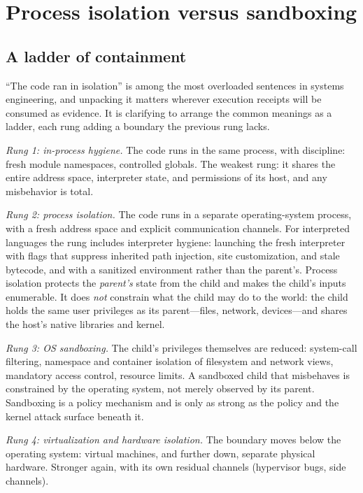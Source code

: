 \section{Process isolation versus sandboxing}\label{ch02:isolation}

\subsection{A ladder of containment}\label{ch02:ladder}

``The code ran in isolation'' is among the most overloaded sentences
in systems engineering, and unpacking it matters wherever execution
receipts will be consumed as evidence. It is clarifying to arrange
the common meanings as a ladder, each rung adding a boundary the
previous rung lacks.

\emph{Rung 1: in-process hygiene.} The code runs in the same
process, with discipline: fresh module namespaces, controlled
globals. The weakest rung: it shares the entire address space,
interpreter state, and permissions of its host, and any misbehavior
is total.

\emph{Rung 2: process isolation.} The code runs in a separate
operating-system process, with a fresh address space and explicit
communication channels. For interpreted languages the rung includes
interpreter hygiene: launching the fresh interpreter with flags
that suppress inherited path injection, site customization, and
stale bytecode, and with a sanitized environment rather than the
parent's. Process isolation protects the \emph{parent's} state from
the child and makes the child's inputs enumerable. It does
\emph{not} constrain what the child may do to the world: the child
holds the same user privileges as its parent---files, network,
devices---and shares the host's native libraries and kernel.

\emph{Rung 3: OS sandboxing.} The child's privileges themselves are
reduced: system-call filtering, namespace and container isolation of
filesystem and network views, mandatory access control, resource
limits. A sandboxed child that misbehaves is constrained by the
operating system, not merely observed by its parent. Sandboxing is a
policy mechanism and is only as strong as the policy and the kernel
attack surface beneath it.

\emph{Rung 4: virtualization and hardware isolation.} The boundary
moves below the operating system: virtual machines, and further
down, separate physical hardware. Stronger again, with its own
residual channels (hypervisor bugs, side channels).

